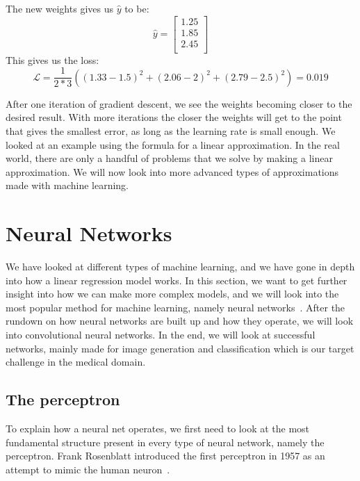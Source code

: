 \noindent The new weights gives us $\hat{y}$ to be:
\begin{equation}
    \hat{y}=\left[\begin{array}{c} 1.25\\ 1.85\\ 2.45\\ \end{array}\right]
\end{equation}
This gives us the loss:
\begin{equation}
   \mathcal{L} = \frac{1}{2*3} \left( {(1.33-1.5)}^2+{(2.06-2)}^2+{(2.79-2.5)}^2 \right) = 0.019
\end{equation}

\noindent After one iteration of gradient descent, we see the weights becoming closer to the desired result. With more iterations the closer the weights will get to the point that gives the smallest error, as long as the learning rate is small enough. 
We looked at an example using the formula for a linear approximation. In the real world, there are only a handful of problems that we solve by making a linear approximation. We will now look into more advanced types of approximations made with machine learning.

    

\section{Neural Networks}
We have looked at different types of machine learning, and we have gone in depth into how a linear regression model works. In this section, we want to get further insight into how we can make more complex models, and we will look into the most popular method for machine learning, namely neural networks~\cite{haykin1994neural}. 
After the rundown on how neural networks are built up and how they operate, we will look into convolutional neural networks. In the end, we will look at successful networks, mainly made for image generation and classification which is our target challenge in the medical domain. 


\subsection{The perceptron}
\label{cha:perceptron}
To explain how a neural net operates, we first need to look at the most fundamental structure present in every type of neural network, namely the perceptron.
Frank Rosenblatt introduced the first perceptron in 1957 as an attempt to mimic the human neuron~\cite{perceptron}.  


